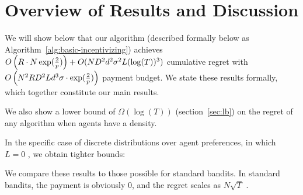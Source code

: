 \section{Overview of Results and Discussion}


%
%

We will show below that our algorithm (described formally below as Algorithm~\ref{alg:basic-incentivizing}) achieves $O \left(R\cdot  N\exp(\frac{2}{p})\right) + O(ND^2 d^2\sigma^2 L(\log(T))^3)$ cumulative regret with $O \left(N^2 R D^2 L d^3 \sigma\cdot \exp(\frac{2}{p}) \right)$ payment budget.  We state these results formally, which together constitute our main results.



We also show a lower bound of $\Omega(\log(T))$ (section~\ref{sec:lb}) on the regret of any algorithm when agents have a density. 

In the specific case of discrete distributions over agent preferences, in which $L=0$ , we obtain tighter bounds:


We compare these results to those possible for standard bandits. In standard bandits, the payment is obviously $0$, and the regret scales as $N \sqrt{T}$ .

